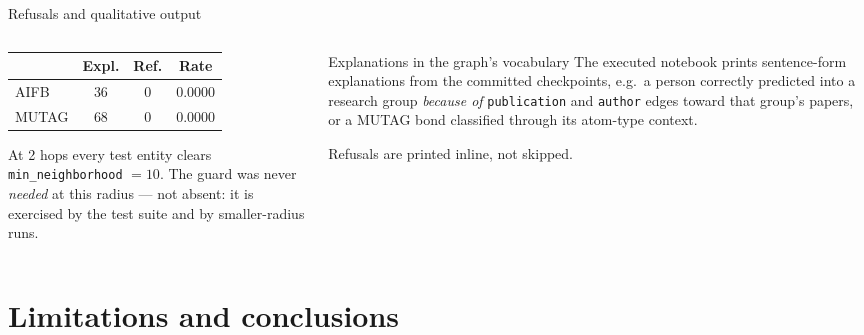 \documentclass[10pt,aspectratio=169]{beamer}
\begin{document}
\begin{frame}{Refusals and qualitative output}
  \begin{columns}[T,onlytextwidth]
    \begin{column}{0.46\textwidth}
      \begin{table}
        \footnotesize
        \begin{tabular}{lccc}
          \toprule
          & \textbf{Expl.} & \textbf{Ref.} & \textbf{Rate} \\
          \midrule
          AIFB  & 36 & 0 & 0.0000 \\
          MUTAG & 68 & 0 & 0.0000 \\
          \bottomrule
        \end{tabular}
      \end{table}
      \footnotesize
      At 2 hops every test entity clears
      \texttt{min\_neighborhood} $=10$. The guard was never \emph{needed} at
      this radius --- not absent: it is exercised by the test suite and by
      smaller-radius runs.
    \end{column}
    \begin{column}{0.50\textwidth}
      \begin{block}{Explanations in the graph's vocabulary}
        \footnotesize
        The executed notebook prints sentence-form explanations from the
        committed checkpoints, e.g.\ a person correctly predicted into a
        research group \emph{because of} \texttt{publication} and
        \texttt{author} edges toward that group's papers, or a MUTAG bond
        classified through its atom-type context.
        \medskip

        Refusals are printed inline, not skipped.
      \end{block}
    \end{column}
  \end{columns}
\end{frame}

\section{Limitations and conclusions}
\end{document}

